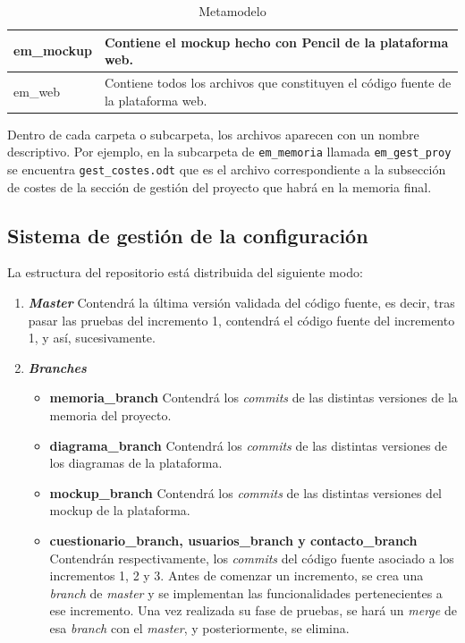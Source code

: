 \begin{table}[htpb]
\begin{tabularx}{\textwidth}{|l|l|X|}
\multicolumn{2}{|X|}{em\_mockup}                  & Contiene el mockup hecho con Pencil de la plataforma web.                                                                  \\ \hline
\multicolumn{2}{|X|}{em\_web}                     & Contiene todos los archivos que constituyen el código fuente de la plataforma web.                                         \\ \hline
\end{tabularx}
\caption{Metamodelo}
\label{tab_metamodelo}
\end{table}

Dentro de cada carpeta o subcarpeta, los archivos aparecen con un nombre descriptivo. Por ejemplo, en la subcarpeta de \texttt{em\_memoria} llamada \texttt{em\_gest\_proy} se encuentra \texttt{gest\_costes.odt} que es el archivo correspondiente a la subsección de costes de la sección de gestión del proyecto que habrá en la memoria final.

\subsection{Sistema de gestión de la configuración}
La estructura del repositorio está distribuida del siguiente modo:

\begin{enumerate}
\item \textbf{\textit{Master}}
Contendrá la última versión validada del código fuente, es decir, tras pasar las pruebas del incremento 1, contendrá el código fuente del incremento 1, y así, sucesivamente.
\item \textbf{\textit{Branches}}
	\begin{itemize}
	\item \textbf{memoria\_branch}
	Contendrá los \textit{commits} de las distintas versiones de la memoria del proyecto.
	\item \textbf{diagrama\_branch}
	Contendrá los \textit{commits} de las distintas versiones de los diagramas de la plataforma.
	\item \textbf{mockup\_branch}
	Contendrá los \textit{commits} de las distintas versiones del mockup de la plataforma.
	\item \textbf{cuestionario\_branch, usuarios\_branch y contacto\_branch}
	Contendrán respectivamente, los \textit{commits} del código fuente asociado a los incrementos 1, 2 y 3.
	Antes de comenzar un incremento, se crea una \textit{branch} de \textit{master} y se implementan las funcionalidades pertenecientes a ese incremento. Una vez realizada su fase de pruebas, se hará un \textit{merge} de esa \textit{branch} con el \textit{master}, y posteriormente, se elimina.
	\end{itemize}
\end{enumerate}


